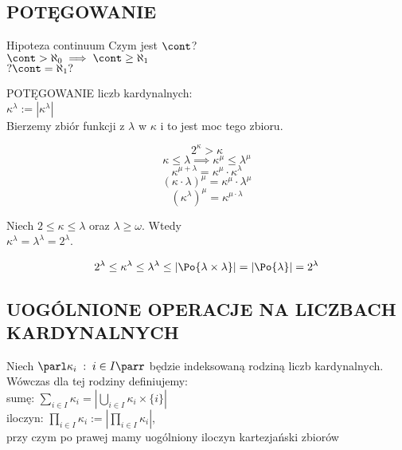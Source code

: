\subsection{POTĘGOWANIE}
\begin{center}\large
    Hipoteza continuum
    Czym jest $\cont$?\smallskip\\
    $\cont>\aleph_0\implies\cont\geq\aleph_1$\smallskip\\
    $?\cont=\aleph_1?$
\end{center}

\begin{center}\large
    {\color{def}POTĘGOWANIE} liczb kardynalnych:\medskip\\
    $\kappa^\lambda:=|\kappa^\lambda|$\medskip\\
    Bierzemy zbiór funkcji z $\lambda$ w $\kappa$ i to jest moc tego zbioru.
\end{center}
$$2^\kappa >\kappa$$
$$\kappa\leq\lambda\implies\kappa^\mu \leq\lambda^\mu$$
$$\kappa^{\mu+\lambda}=\kappa^\mu\cdot\kappa^\lambda$$
$$(\kappa\cdot\lambda)^\mu=\kappa^\mu\cdot\lambda^\mu$$
$$(\kappa^\lambda )^\mu =\kappa^{\mu\cdot\lambda}$$

\begin{center}\large
    Niech $2\leq\kappa\leq\lambda$ oraz $\lambda\geq\omega$. Wtedy\smallskip\\
    $\kappa^\lambda=\lambda^\lambda=2^\lambda$.
\end{center}
\dowod
$$2^\lambda\leq\kappa^\lambda \leq\lambda^\lambda \leq |\Po{\lambda\times\lambda}|=|\Po{\lambda}| = 2^\lambda$$
\kondow

\subsection{UOGÓLNIONE OPERACJE NA LICZBACH KARDYNALNYCH}

\begin{center}\large
    Niech $\parl\kappa_i\;:\;i\in I\parr$ będzie indeksowaną rodziną liczb kardynalnych. \smallskip\\
    Wówczas dla tej rodziny definiujemy:\medskip\\
    {\color{def}sumę:} $\sum\limits_{i\in I}\kappa_i = |\bigcup\limits_{i\in I} \kappa_i\times\{i\}|$\medskip\\
    {\color{def}iloczyn}: $\prod\limits_{i\in I} \kappa_i:= |\prod\limits_{i\in I} \kappa_i|$, \\przy czym po prawej mamy uogólniony iloczyn kartezjański zbiorów
\end{center}

